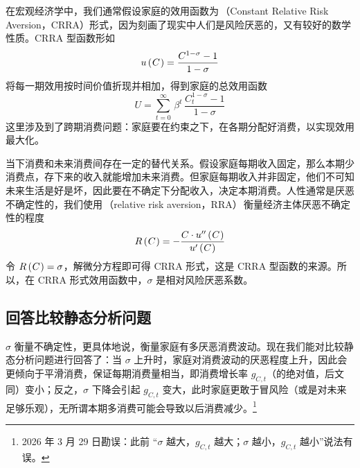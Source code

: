 在宏观经济学中，我们通常假设家庭的效用函数为\,（Constant Relative Risk Aversion，CRRA）形式，因为刻画了现实中人们是风险厌恶的，又有较好的数学性质。CRRA 型函数形如
\begin{equation*}
    u\left(\mspace{1mu} C\mspace{1mu}\right)=\dfrac{C^{1-\sigma}-1}{1-\sigma}
\end{equation*}
将每一期效用按时间价值折现并相加，得到家庭的总效用函数
\begin{equation*}
    U=\sum_{t=0}^\infty \,\beta^t\,\dfrac{C_t^{1-\sigma}-1}{1-\sigma}
\end{equation*}
这里涉及到了跨期消费问题：家庭要在约束之下，在各期分配好消费，以实现效用最大化。

当下消费和未来消费间存在一定的替代关系。假设家庭每期收入固定，那么本期少消费点，存下来的收入就能增加未来消费。但家庭每期收入并非固定，他们不可知未来生活是好是坏，因此要在不确定下分配收入，决定本期消费。人性通常是厌恶不确定性的，我们使用\,（relative risk aversion，RRA）\,衡量经济主体厌恶不确定性的程度
\begin{equation*}
    R\left(\mspace{1mu} C\mspace{1mu}\right)=-\dfrac{C\cdot u''\left(\mspace{1mu} C\mspace{1mu}\right)}{u'\left(\mspace{1mu} C\mspace{1mu}\right)}
\end{equation*}
令 \(R\left(\mspace{1mu} C\mspace{1mu}\right)=\sigma\)，解微分方程即可得 CRRA 形式，这是 CRRA 型函数的来源。所以，在 CRRA 形式效用函数中，\(\sigma\) 是相对风险厌恶系数。

\subsection{回答比较静态分析问题}\label{subsec:ReplyCompStatic}

\(\sigma\) 衡量不确定性，更具体地说，衡量家庭有多厌恶消费波动。现在我们能对比较静态分析问题进行回答了：当 \(\sigma\) 上升时，家庭对消费波动的厌恶程度上升，因此会更倾向于平滑消费，保证每期消费量相当，即消费增长率 \(g_{C,t}\)（的绝对值，后文同）变小；反之，\(\sigma\) 下降会引起 \(g_{C,t}\) 变大，此时家庭更敢于冒风险（或是对未来足够乐观），无所谓本期多消费可能会导致以后消费减少。\footnote{2026 年 3 月 29 日勘误：此前 “\(\sigma\) 越大，\(g_{C,t}\) 越大；\(\sigma\) 越小，\(g_{C,t}\) 越小”说法有误。}

